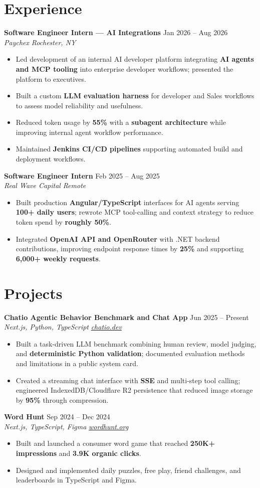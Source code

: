 \documentclass[10pt,letterpaper]{article}
\newif\ifresumeFirstRole
\newcommand{\resumeRole}[4]{%
  \ifresumeFirstRole
    \global\resumeFirstRolefalse
  \else
    \vspace{0pt plus 1fill}%
  \fi
  \textbf{#1} \hfill #2\\
  \textit{#3} \hfill \textit{#4}
}
\begin{document}
\section*{Experience}
\resumeRole{Software Engineer Intern --- AI Integrations}{Jan 2026 -- Aug 2026}{Paychex}{Rochester, NY}
\begin{itemize}
  \item Led development of an internal AI developer platform integrating \textbf{AI agents and MCP tooling} into enterprise developer workflows; presented the platform to executives.
  \item Built a custom \textbf{LLM evaluation harness} for developer and Sales workflows to assess model reliability and usefulness.
  \item Reduced token usage by \textbf{55\%} with a \textbf{subagent architecture} while improving internal agent workflow performance.
  \item Maintained \textbf{Jenkins CI/CD pipelines} supporting automated build and deployment workflows.
\end{itemize}
\resumeRole{Software Engineer Intern}{Feb 2025 -- Aug 2025}{Real Wave Capital}{Remote}
\begin{itemize}
  \item Built production \textbf{Angular/TypeScript} interfaces for AI agents serving \textbf{100+ daily users}; rewrote MCP tool-calling and context strategy to reduce token spend by \textbf{roughly 50\%}.
  \item Integrated \textbf{OpenAI API and OpenRouter} with .NET backend contributions, improving endpoint response times by \textbf{25\%} and supporting \textbf{6,000+ weekly requests}.
\end{itemize}

\section*{Projects}
\resumeRole{Chatio Agentic Behavior Benchmark and Chat App}{Jun 2025 -- Present}{Next.js, Python, TypeScript}{\href{https://chatio.dev}{chatio.dev}}
\begin{itemize}
  \item Built a task-driven LLM benchmark combining human review, model judging, and \textbf{deterministic Python validation}; documented evaluation methods and limitations in a public system card.
  \item Created a streaming chat interface with \textbf{SSE} and multi-step tool calling; engineered IndexedDB/Cloudflare R2 persistence that reduced image storage by \textbf{95\%} through compression.
\end{itemize}
\resumeRole{Word Hunt}{Sep 2024 -- Dec 2024}{Next.js, TypeScript, Figma}{\href{https://wordhunt.org}{wordhunt.org}}
\begin{itemize}
  \item Built and launched a consumer word game that reached \textbf{250K+ impressions} and \textbf{3.9K organic clicks}.
  \item Designed and implemented daily puzzles, free play, friend challenges, and leaderboards in TypeScript and Figma.
\end{itemize}
\end{document}
